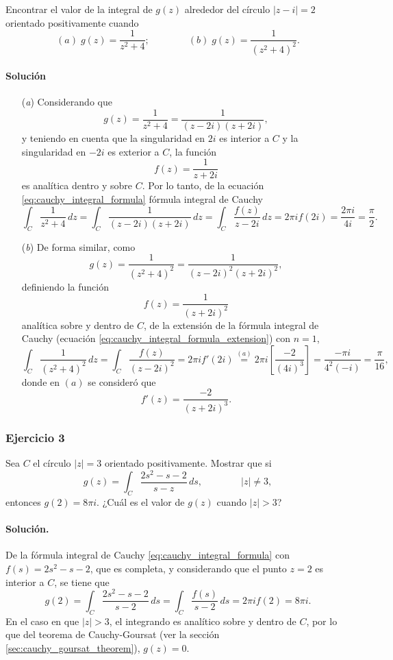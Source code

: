 \documentclass[a4paper]{report}
\begin{document}
Encontrar el valor de la integral de \(g(z)\) alrededor del círculo \(|z-i|=2\) orientado positivamente cuando 
\[
 (\textit{a})\;g(z)=\frac{1}{z^2+4};\qquad\qquad 
 (\textit{b})\;g(z)=\frac{1}{(z^2+4)^2}.
\]

\paragraph{Solución}
\begin{enumerate}
 \item[(\textit{a})] Considerando que 
 \[
  g(z)=\frac{1}{z^2+4}=\frac{1}{(z-2i)(z+2i)},
 \]
 y teniendo en cuenta que la singularidad en \(2i\) es interior a \(C\) y la singularidad en \(-2i\) es exterior a \(C\), la función 
 \[
  f(z)=\frac{1}{z+2i}
 \]
 es analítica dentro y sobre \(C\). Por lo tanto, de la ecuación \ref{eq:cauchy_integral_formula} fórmula integral de Cauchy
 \[
  \int_C\frac{1}{z^2+4}\,dz=\int_C\frac{1}{(z-2i)(z+2i)}\,dz=\int_C\frac{f(z)}{z-2i}\,dz=2\pi if(2i)=\frac{2\pi i}{4i}=\frac{\pi}{2}.
 \]
 \item[(\textit{b})] De forma similar, como
 \[
  g(z)=\frac{1}{(z^2+4)^2}=\frac{1}{(z-2i)^2(z+2i)^2},  
 \]
 definiendo la función 
 \[
  f(z)=\frac{1}{(z+2i)^2}
 \]
 analítica sobre y dentro de \(C\), de la extensión de la fórmula integral de Cauchy (ecuación \ref{eq:cauchy_integral_formula_extension}) con \(n=1\),
 \[
  \int_C\frac{1}{(z^2+4)^2}\,dz=\int_C\frac{f(z)}{(z-2i)^2}=2\pi if'(2i)
  \overset{(a)}{=}2\pi i\left[\frac{-2}{(4i)^3}\right]=\frac{-\pi i}{4^2(-i)}=\frac{\pi}{16},
 \]
 donde en \((a)\) se consideró que 
 \[
  f'(z)=\frac{-2}{(z+2i)^3}.
 \]
\end{enumerate}

\subsubsection*{Ejercicio 3}

Sea \(C\) el círculo \(|z|=3\) orientado positivamente. Mostrar que si
\[
 g(z)=\int_C\frac{2s^2-s-2}{s-z}\,ds,
 \qquad\qquad
 |z|\neq3,
\]
entonces \(g(2)=8\pi i\). ¿Cuál es el valor de \(g(z)\) cuando \(|z|>3\)?

\paragraph{Solución.} De la fórmula integral de Cauchy \ref{eq:cauchy_integral_formula} con \(f(s)=2s^2-s-2\), que es completa, y considerando que el punto \(z=2\) es interior a \(C\), se tiene que 
\[
 g(2)=\int_C\frac{2s^2-s-2}{s-2}\,ds=\int_C\frac{f(s)}{s-2}\,ds=2\pi if(2)=8\pi i.
\]
En el caso en que \(|z|>3\), el integrando es analítico sobre y dentro de \(C\), por lo que del teorema de Cauchy-Goursat (ver la sección \ref{sec:cauchy_goursat_theorem}), \(g(z)=0\).
\end{document}
